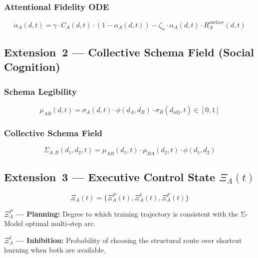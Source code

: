 \documentclass[11pt]{article}
\theoremstyle{definition}
\theoremstyle{plain}
\begin{document}
\subsubsection{Attentional Fidelity ODE}
\begin{equation}\label{eq:alpha-ode}
\dot{\alpha}_A(d,t) = \gamma \cdot C_A(d,t) \cdot (1 - \alpha_A(d,t)) - \zeta_{\alpha} \cdot \alpha_A(d,t) \cdot R_A^{\text{surface}}(d,t)
\end{equation}

\subsection{Extension~2 --- Collective Schema Field (Social Cognition)}\label{sec:social}

\subsubsection{Schema Legibility}
\begin{equation}\label{eq:schema-legibility}
\mu_{AB}(d,t) = \sigma_A(d,t) \cdot \phi(d_A, d_B) \cdot \sigma_B(d_{\text{adj}},t) \in [0,1]
\end{equation}

\subsubsection{Collective Schema Field}
\begin{equation}\label{eq:collective-field}
\Sigma_{A,B}(d_1,d_2,t) = \mu_{AB}(d_1,t) \cdot \mu_{BA}(d_2,t) \cdot \phi(d_1,d_2)
\end{equation}

\subsection{Extension~3 --- Executive Control State \texorpdfstring{$\Xi_A(t)$}{Xi\_A(t)}}\label{sec:executive}

\begin{equation}\label{eq:executive-state}
\Xi_A(t) = \{\Xi_A^P(t), \Xi_A^I(t), \Xi_A^F(t)\}
\end{equation}

\textbf{$\Xi_A^P$ --- Planning:} Degree to which training trajectory is
consistent with the Σ-Model optimal multi-step arc.

\textbf{$\Xi_A^I$ --- Inhibition:} Probability of choosing the structural
route over shortcut learning when both are available.
\end{document}
